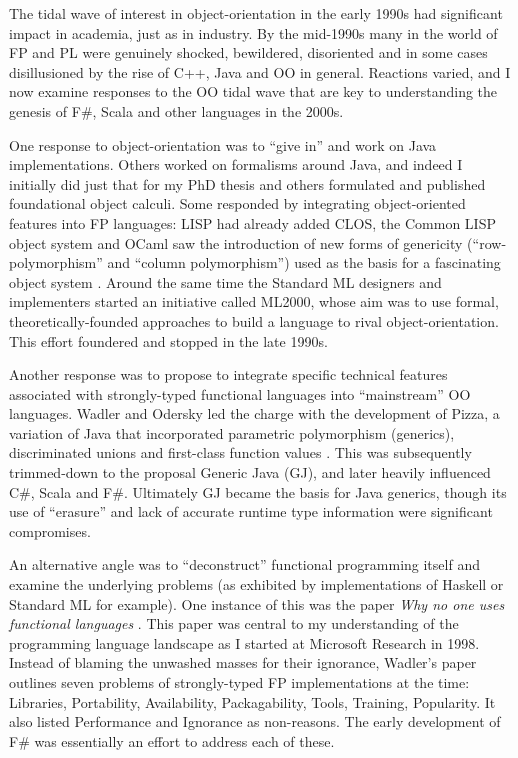 \documentclass[acmsmall,screen]{acmart}
\begin{document}
The tidal wave of interest in object-orientation in the early 1990s had significant impact in academia, just as in industry.  By the mid-1990s many in the world of FP and PL
were genuinely shocked, bewildered, disoriented and in some cases disillusioned by the rise of C++, Java and OO in general.  Reactions varied, and I now examine responses to
the OO tidal wave that are key to understanding the genesis of F\#, Scala and other languages in the 2000s. 

One response to object-orientation was to “give in” and work on Java implementations. Others worked on formalisms around Java, and indeed I initially
did just that for my PhD thesis \citep{Syme1999} and others formulated and published foundational object calculi. Some responded by integrating object-oriented
features into FP languages: LISP had already added CLOS, the Common LISP object system and OCaml saw the introduction of new forms of
genericity (“row-polymorphism” and “column polymorphism”) used as the basis for a fascinating object system \citep{Garrigue2001}. Around the same time the Standard ML
designers and implementers started an initiative called ML2000, whose aim was to use formal, theoretically-founded 
approaches to build a language to rival object-orientation. This effort foundered and stopped in the late 1990s.

Another response was to propose to integrate specific technical features associated with strongly-typed functional languages into “mainstream” OO
languages.  Wadler and Odersky led the charge with the development of Pizza, a variation of Java that incorporated parametric polymorphism (generics), discriminated
unions and first-class function values \citep{Bracha1998}.  This was subsequently trimmed-down to the proposal Generic
Java (GJ), and later heavily influenced C\#, Scala and F\#. Ultimately GJ became the basis for Java generics, though its use of “erasure” and lack of accurate
runtime type information were significant compromises. 

An alternative angle was to “deconstruct” functional programming itself and examine the underlying problems (as exhibited by implementations of Haskell
or Standard ML for example). One instance of this was the paper \textit{Why no one uses functional languages} \citep{Wadler1998}. This paper was central to
my understanding of the programming language landscape as I started at Microsoft Research in 1998.  Instead of blaming the unwashed masses for their
ignorance, Wadler’s paper outlines seven problems of strongly-typed FP implementations at the time: Libraries, Portability, Availability, Packagability, Tools,
Training, Popularity.  It also listed Performance and Ignorance as non-reasons. The early development of F\# was essentially an effort to address each of these.
\end{document}

